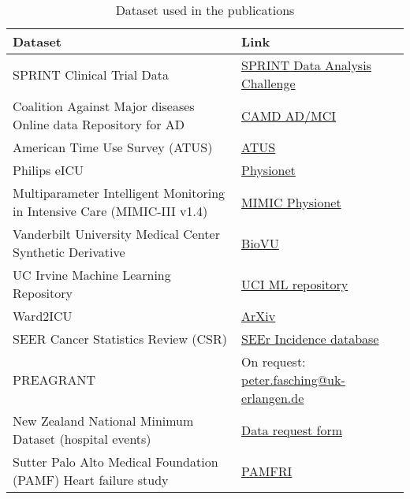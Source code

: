 \begin{table}[H]
    \footnotesize
    \caption{Dataset used in the publications\label{tab:5:datasets}}
    \begin{tabularx}{\textwidth}{@{}Xp{2cm}@{}}\toprule
    Dataset & Link\\\midrule
    
    SPRINT Clinical Trial Data \cite{wright2016randomized} 
    & \href{https://challenge.nejm.org/pages/home}{SPRINT Data Analysis Challenge}\\
    
    Coalition Against Major diseases Online data Repository for AD \cite{Neville_2015} 
    &\href{https://c-path.org/programs/dcc/projects/alzheimers-disease/coalition-against-major-diseases-consortium-database-camd-admci/}{CAMD AD/MCI}\\
     
    American Time Use Survey (ATUS) \cite{us_bureau_of_labor_statistics_american_nodate}
    & \href{https://www.bls.gov/tus/}{ATUS}\\

    Philips eICU \cite{pollard2018eicu}
    & \href{https://physionet.org}{Physionet \cite{Goldberger_2000}}\\
    
    Multiparameter Intelligent Monitoring in Intensive Care (MIMIC-III v1.4) \cite{Johnson_2016}
    & \href{https://mimic.physionet.org}{MIMIC Physionet} \cite{Goldberger_2000}\\
    
    Vanderbilt University Medical Center Synthetic Derivative \cite{Roden_2008}   
    & \href{https://victr.vumc.org/biovu-description/}{BioVU}\\
    
    UC Irvine Machine Learning Repository \cite{Dua:2019}  
    & \href{http://archive.ics.uci.edu/ml/index.php }{UCI ML repository}\\
    
    Ward2ICU \cite{severo2019ward2icu} 
    & \href{https://arxiv.org/abs/1910.00752}{ArXiv}\\
    
    SEER Cancer Statistics Review (CSR) \cite{noone2018cronin} 
    & \href{https://seer.cancer.gov/data/access.html}{SEEr Incidence database}\\
    
    PREAGRANT \cite{Fasching_2015} & 
    On request: \href{mailto:peter.fasching@uk-erlangen.de}{peter.fasching@uk-erlangen.de} \\
    
    New Zealand National Minimum Dataset (hospital events) \cite{events}
    & \href{https://www.health.govt.nz/nz-health-statistics/access-and-use/data-request-form}{Data request form}\\
    
    Sutter Palo Alto Medical Foundation (PAMF)  Heart failure study \cite{Choi2017-nt} 
    & \href{https://www.sutterhealth.org/research/pamfri}{PAMFRI}\\
    
    \bottomrule
    \end{tabularx}
\end{table}